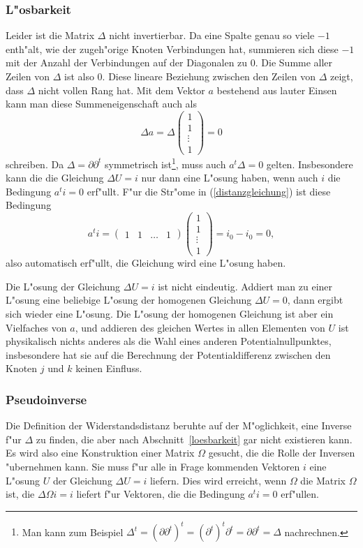 \documentclass[a4paper,12pt]{article}
\begin{document}
\subsubsection{L"osbarkeit\label{loesbarkeit}}
Leider ist die Matrix $\Delta$ nicht invertierbar.
Da eine Spalte genau so viele $-1$ enth"alt, wie der zugeh"orige Knoten
Verbindungen hat, summieren sich diese $-1$ mit der Anzahl der Verbindungen
auf der Diagonalen zu $0$.
Die Summe aller Zeilen von $\Delta$ ist also $0$.
Diese lineare Beziehung zwischen den Zeilen von $\Delta$ zeigt, dass 
$\Delta$ nicht vollen Rang hat.
Mit dem Vektor $a$ bestehend aus lauter Einsen kann
man diese Summeneigenschaft auch als
\begin{equation}
\Delta a
=
\Delta\begin{pmatrix}1\\1\\\vdots\\1\end{pmatrix}
=0
\end{equation}
schreiben.
Da $\Delta=\partial\partial^t$ symmetrisch ist\footnote{Man kann zum Beispiel
$\Delta^t=(\partial\partial^t)^t=(\partial^t)^t\partial^t=\partial\partial^t
=\Delta$ nachrechnen.}, muss auch $a^t\Delta=0$ gelten.
Insbesondere kann die die Gleichung $\Delta U=i$ nur dann eine L"osung
haben, wenn auch $i$ die Bedingung $a^ti=0$ erf"ullt.
F"ur die Str"ome in (\ref{distanzgleichung}) ist diese Bedingung
\[
a^ti=
\begin{pmatrix}1&1&\dots&1\end{pmatrix}\begin{pmatrix}1\\1\\\vdots\\1\end{pmatrix}
=i_0-i_0=0,
\]
also automatisch erf"ullt, die Gleichung wird eine L"osung haben.

Die L"osung der Gleichung $\Delta U=i$ ist nicht eindeutig.
Addiert man zu einer L"osung eine beliebige L"osung der homogenen Gleichung
$\Delta U=0$, dann ergibt sich wieder eine L"osung.
Die L"osung der homogenen Gleichung ist aber ein Vielfaches von $a$,
und addieren des gleichen Wertes in allen Elementen von $U$ ist physikalisch
nichts anderes als die Wahl eines anderen Potentialnullpunktes,
insbesondere hat sie auf die Berechnung der Potentialdifferenz zwischen
den Knoten $j$ und $k$ keinen Einfluss.

\subsubsection{Pseudoinverse}
Die Definition der Widerstandsdistanz beruhte auf der M"oglichkeit, eine
Inverse f"ur $\Delta$ zu finden, die aber nach Abschnitt~\ref{loesbarkeit}
gar nicht existieren kann.
Es wird also eine Konstruktion einer Matrix $\Omega$ gesucht, die
die Rolle der Inversen "ubernehmen kann.
Sie muss f"ur alle in Frage kommenden Vektoren $i$ eine L"osung $U$
der Gleichung $\Delta U=i$ liefern.
Dies wird erreicht, wenn $\Omega$ die Matrix $\Omega$ ist, die
$\Delta\Omega i=i$ liefert f"ur Vektoren, die die Bedingung  $a^ti=0$ erf"ullen.
\end{document}
